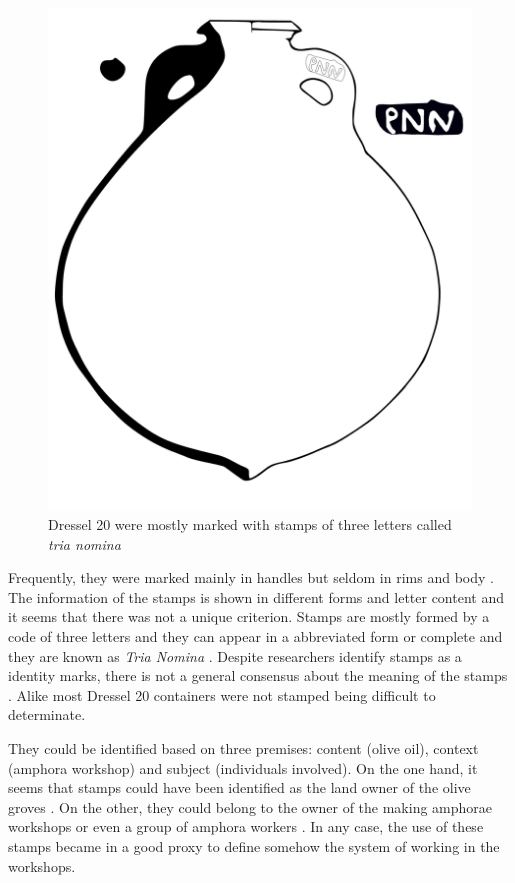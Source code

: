 \documentclass[review]{elsarticle}
\begin{document}
\begin{figure}[htp]
	\centering
\includegraphics[scale=0.5]{figs/dressel20}
\caption{Dressel 20 were mostly marked with stamps of three letters called \textit{tria nomina}}
\label{amphora}
\end{figure} 

Frequently, they were marked mainly in handles but seldom in rims and body \citep{millet_anforas_1998}. 
The information of the stamps is shown in different forms and letter content and it seems that there was not a unique criterion. Stamps are mostly formed by a code of three letters and they can appear in a abbreviated form or complete and they are known as \textit{Tria Nomina} \citep{berni_millet_amphora_1996}. Despite researchers identify stamps as a identity marks, there is not a general consensus about the meaning of the stamps \citep{rodriguez_baetican_1998}. Alike most Dressel 20 containers were not stamped being difficult to determinate. 

They could be identified based on three premises: content (olive oil), context (amphora workshop) and subject (individuals involved). On the one hand, it seems that stamps could have been identified as the land owner of the olive groves \citep{rodriguez_economioleicola_1977}. On the other, they could belong to the owner of the making amphorae workshops or even a group of amphora workers \citep{berni_millet_epigrafianforica_2008}. In any case, the use of these stamps became in a good proxy to define somehow the system of working in the workshops. 
\end{document}
